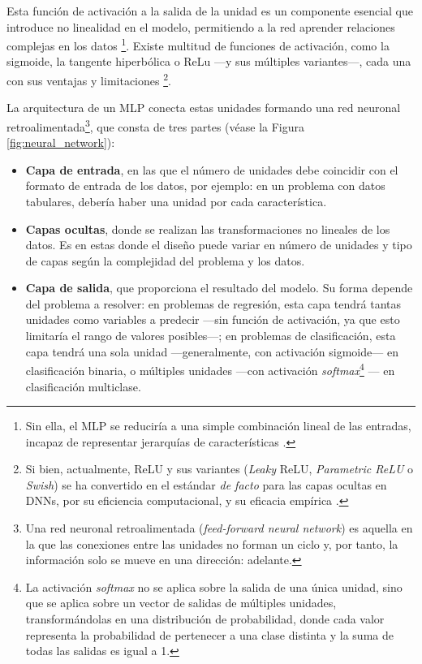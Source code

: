 Esta función de activación a la salida de la unidad es un componente esencial que introduce no linealidad 
en el modelo, permitiendo a la red aprender relaciones complejas en los datos
\footnote{Sin ella, el MLP se reduciría a una simple combinación lineal de las entradas, incapaz de
representar jerarquías de características \cite{murphy2022}.}. Existe multitud de funciones de activación, 
como la sigmoide, la tangente hiperbólica o ReLu ---y sus múltiples variantes---, cada una con sus ventajas 
y limitaciones
\footnote{Si bien, actualmente, ReLU y sus variantes (\textit{Leaky} ReLU, \textit{Parametric ReLU} o 
\textit{Swish}) se ha convertido en el estándar \textit{de facto} para las capas ocultas en DNNs,
por su eficiencia computacional, y su eficacia empírica \cite{vargas2021}.}.

La arquitectura de un MLP conecta estas unidades formando una red neuronal retroalimentada\footnote{Una red 
neuronal retroalimentada (\textit{feed-forward neural network}) es aquella en la que las conexiones entre las 
unidades no forman un ciclo y, por tanto, la información solo se mueve en una dirección: adelante.},
que consta de tres partes (véase la Figura \ref{fig:neural_network}):

\begin{itemize}

    \item \textbf{Capa de entrada}, en las que el número de unidades debe coincidir con el formato de entrada 
    de los datos, por ejemplo: en un problema con datos tabulares, debería haber una unidad por cada 
    característica.
    
    \item \textbf{Capas ocultas}, donde se realizan las transformaciones no lineales de los datos. Es en estas 
    donde el diseño puede variar en número de unidades y tipo de capas según la complejidad del problema y los 
    datos.
    
    \item \textbf{Capa de salida}, que proporciona el resultado del modelo. Su forma depende del problema a 
    resolver: en problemas de regresión, esta capa tendrá tantas unidades como variables a predecir ---sin 
    función de activación, ya que esto limitaría el rango de valores posibles---; en problemas de 
    clasificación, esta capa tendrá una sola unidad ---generalmente, con activación sigmoide--- en 
    clasificación binaria, o múltiples unidades ---con activación \textit{softmax}\footnote{La activación 
    \textit{softmax} no se aplica sobre la salida de una única unidad, sino que se aplica sobre un vector de 
    salidas de múltiples unidades, transformándolas en una distribución de probabilidad, donde cada valor 
    representa la probabilidad de pertenecer a una clase distinta y la suma de todas las salidas es igual a 
    1.}
    --- en clasificación multiclase.

\end{itemize}

